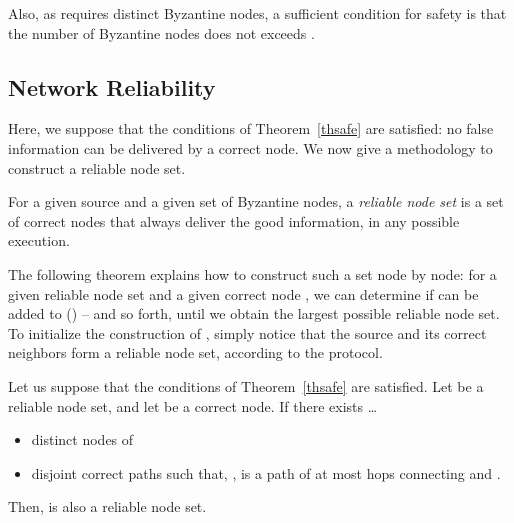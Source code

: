 \documentclass[a4paper,11pt]{article}
\begin{document}
Also, as  requires  distinct Byzantine nodes, a sufficient condition for safety is that the number of Byzantine nodes does not exceeds .


\subsection{Network Reliability}
\label{relnet}

Here, we suppose that the conditions of Theorem~\ref{thsafe} are satisfied: no false information can be delivered by a correct node.
We now give a methodology to construct a reliable node set.

\label{partrel}

\begin{definition}
\label{rns}
For a given source and a given set of Byzantine nodes,
a \emph{reliable node set} is a set of correct nodes that always deliver the good information, in any possible execution.
\end{definition}

The following theorem explains how to construct such a set node by node: for a given reliable node set  and a given correct node , we can determine if  can be added to  () -- and so forth, until we obtain the largest possible reliable node set.
To initialize the construction of , simply notice that the source and its correct neighbors form a reliable node set, according to the protocol.


\begin{theorem}

\label{threl}
Let us suppose that the conditions of Theorem~\ref{thsafe} are satisfied.
Let  be a reliable node set, and let  be a correct node. If there exists \dots
\begin{itemize}
\item  distinct nodes  of 
\item  disjoint correct paths  such that, ,  is a path of at most  hops connecting  and .
\end{itemize}
Then,  is also a reliable node set.
\end{theorem}
\end{document}
